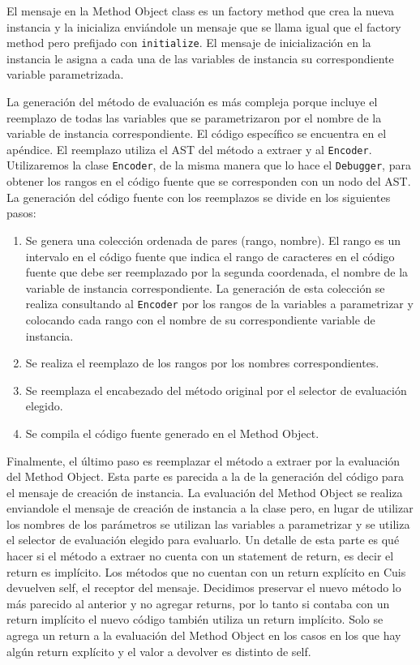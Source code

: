 El mensaje en la Method Object class es un factory method que crea la nueva
instancia y la inicializa enviándole un mensaje que se llama igual que el
factory method pero prefijado con \lstinline{initialize}. El mensaje de
inicialización en la instancia le asigna a cada una de las variables de
instancia su correspondiente variable parametrizada.

La generación del método de evaluación es más compleja porque incluye el
reemplazo de todas las variables
que se parametrizaron por el nombre de la variable de instancia
correspondiente. El código específico se encuentra en el apéndice. El reemplazo
utiliza el AST del método a extraer y al \lstinline{Encoder}. Utilizaremos la
clase \lstinline{Encoder}, de la misma manera que lo hace el
\lstinline{Debugger}, para obtener los rangos en el código fuente que se
corresponden con un nodo del AST. La generación del código fuente con los
reemplazos se divide en los siguientes pasos:

\begin{enumerate}
    \item Se genera una colección ordenada de pares (rango, nombre). El rango es
      un intervalo en el código fuente que indica el rango de caracteres en el
      código fuente que debe ser reemplazado por la segunda coordenada, el
      nombre de la variable de instancia correspondiente. La generación de esta
      colección se realiza consultando al \lstinline{Encoder} por los rangos de
      la variables a parametrizar y colocando cada rango con el nombre de su
      correspondiente variable de instancia.
    \item Se realiza el reemplazo de los rangos por los nombres
      correspondientes.
    \item Se reemplaza el encabezado del método original por el selector de
      evaluación elegido.
    \item Se compila el código fuente generado en el Method Object.
\end{enumerate}

Finalmente, el último paso es reemplazar el método a extraer por la evaluación
del Method Object.  Esta parte es parecida a la de la generación del código para
el mensaje de creación de instancia. La evaluación del Method Object se realiza
enviandole el mensaje de creación de instancia a la clase pero, en lugar de
utilizar los nombres de los parámetros se utilizan las variables a parametrizar
y se utiliza el selector de evaluación elegido para evaluarlo. Un detalle de
esta parte es qué hacer si el método a extraer no cuenta con un statement de
return, es decir el return es implícito. Los métodos que no cuentan con un
return explícito en Cuis devuelven self, el receptor del mensaje.  Decidimos
preservar el nuevo método lo más parecido al anterior y no agregar returns, por
lo tanto si contaba con un return implícito el nuevo código también utiliza un
return implícito. Solo se agrega un return a la evaluación del Method Object en
los casos en los que hay algún return explícito y el valor a devolver es
distinto de self.




